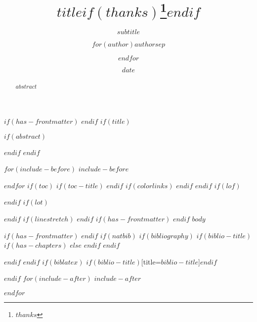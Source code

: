 \documentclass[
$if(fontsize)$
  $fontsize$,
$endif$
$if(papersize)$
  $papersize$paper,
$endif$
$for(classoption)$
  $classoption$$sep$,
$endfor$
]{$documentclass$}
\title{$title$$if(thanks)$\thanks{$thanks$}$endif$}
\subtitle{$subtitle$}
\author{$for(author)$$author$$sep$ \and $endfor$}
\date{$date$}
\begin{document}
$if(has-frontmatter)$
\frontmatter
$endif$
$if(title)$
\maketitle
$if(abstract)$
\begin{abstract}
$abstract$
\end{abstract}
$endif$
$endif$

$for(include-before)$
$include-before$

$endfor$
$if(toc)$
$if(toc-title)$
\renewcommand*\contentsname{$toc-title$}
$endif$
{
$if(colorlinks)$
\hypersetup{linkcolor=$if(toccolor)$$toccolor$$else$$endif$}
$endif$
\setcounter{tocdepth}{$toc-depth$}
\tableofcontents
}
$endif$
$if(lof)$
\listoffigures
$endif$
$if(lot)$
\listoftables
$endif$
$if(linestretch)$
$endif$
$if(has-frontmatter)$
\mainmatter
$endif$
$body$

$if(has-frontmatter)$
\backmatter
$endif$
$if(natbib)$
$if(bibliography)$
$if(biblio-title)$
$if(has-chapters)$
\renewcommand\bibname{$biblio-title$}
$else$
\renewcommand\refname{$biblio-title$}
$endif$
$endif$


$endif$
$endif$
$if(biblatex)$
\printbibliography$if(biblio-title)$[title=$biblio-title$]$endif$

$endif$
$for(include-after)$
$include-after$

$endfor$
\end{document}
